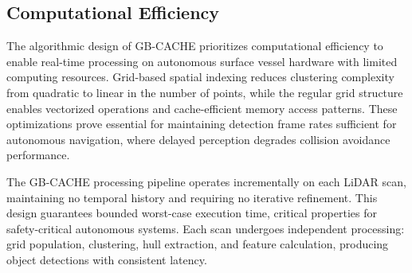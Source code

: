 \documentclass{erauthesis}
\begin{document}



\subsection{Computational Efficiency} \label{sec:gbcache_efficiency}

The algorithmic design of \ac{GB-CACHE} prioritizes computational efficiency to enable real-time processing on autonomous surface vessel hardware with limited computing resources.
Grid-based spatial indexing reduces clustering complexity from quadratic to linear in the number of points, while the regular grid structure enables vectorized operations and cache-efficient memory access patterns.
These optimizations prove essential for maintaining detection frame rates sufficient for autonomous navigation, where delayed perception degrades collision avoidance performance.

The GB-CACHE processing pipeline operates incrementally on each \ac{LiDAR} scan, maintaining no temporal history and requiring no iterative refinement.
This design guarantees bounded worst-case execution time, critical properties for safety-critical autonomous systems.
Each scan undergoes independent processing: grid population, clustering, hull extraction, and feature calculation, producing object detections with consistent latency.
\end{document}
